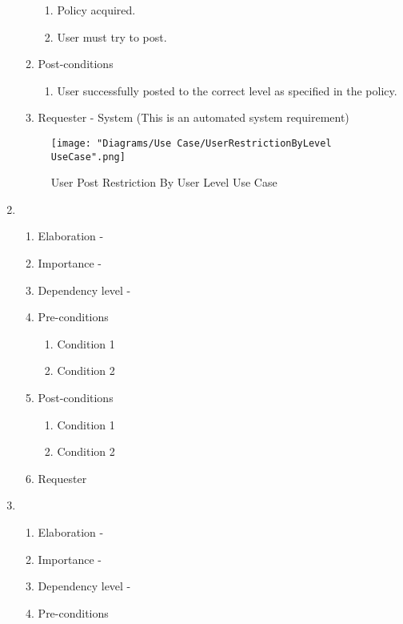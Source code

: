 \documentclass[12pt]{article}
\begin{document}
\begin{enumerate}
\begin{enumerate}
\begin{enumerate}
    	\item Policy acquired.
    	\item User must try to post.
    \end{enumerate}
        \item Post-conditions
    \begin{enumerate}
    	\item User successfully posted to the correct level as specified in the policy.
    \end{enumerate}
    \item Requester - System (This is an automated system requirement)
  \end{enumerate}
\begin{figure}[h]
	\centering
	\texttt{[image: "Diagrams/Use Case/UserRestrictionByLevel UseCase".png]}
	\caption{User Post Restriction By User Level Use Case}
\end{figure}
\newpage %
   \item  %
  \begin{enumerate}
    \item Elaboration - 
    \item Importance - 
    \item Dependency level - 
    \item Pre-conditions
    \begin{enumerate}
    	\item Condition 1
    	\item Condition 2
    \end{enumerate}
        \item Post-conditions
    \begin{enumerate}
    	\item Condition 1
    	\item Condition 2
    \end{enumerate}
    \item Requester
  \end{enumerate}
\newpage %
   \item  %
  \begin{enumerate}
    \item Elaboration - 
    \item Importance - 
    \item Dependency level - 
    \item Pre-conditions

\end{enumerate}
\end{enumerate}
\end{document}
